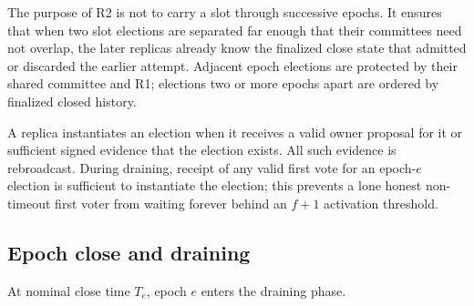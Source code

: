\documentclass[11pt]{article}
\theoremstyle{remark}
\begin{document}
The purpose of R2 is not to carry a slot through successive epochs. It ensures that when two slot elections are separated far enough that their committees need not overlap, the later replicas already know the finalized close state that admitted or discarded the earlier attempt. Adjacent epoch elections are protected by their shared committee and R1; elections two or more epochs apart are ordered by finalized closed history.

A replica instantiates an election when it receives a valid owner proposal for it or sufficient signed evidence that the election exists. All such evidence is rebroadcast. During draining, receipt of any valid first vote for an epoch-$e$ election is sufficient to instantiate the election; this prevents a lone honest non-timeout first voter from waiting forever behind an $f+1$ activation threshold.

\subsection{Epoch close and draining}

At nominal close time $T_e$, epoch $e$ enters the draining phase.
\end{document}

